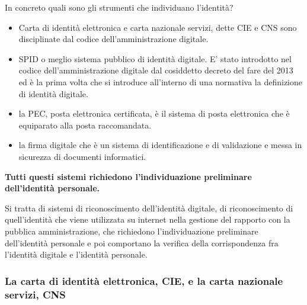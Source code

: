  In concreto quali sono gli strumenti che individuano l'identità? 
 
 \begin{itemize}
    \item Carta di identità elettronica e carta nazionale servizi, dette CIE e CNS sono disciplinate dal codice dell'amministrazione digitale.
 \item SPID o meglio sistema pubblico di identità digitale. E' stato introdotto nel codice dell'amministrazione digitale dal cosiddetto decreto del fare del 2013 ed è la prima volta che si introduce all'interno di una normativa la definizione di identità digitale. 
 \item la PEC, posta elettronica certificata, è il sistema di posta elettronica che è equiparato alla posta raccomandata. 
 \item la firma digitale che è un sistema di identificazione e di validazione e messa in sicurezza di documenti informatici. 
 \end{itemize}
 \textbf{Tutti questi sistemi richiedono l'individuazione preliminare dell'identità personale.}\par
 Si tratta di sistemi di riconoscimento dell'identità digitale, di riconoscimento di quell'identità che viene utilizzata su internet nella gestione del rapporto con la pubblica amministrazione, che richiedono l'individuazione preliminare dell'identità personale e poi comportano la verifica della corrispondenza fra l'identità digitale e l'identità personale. 

\subsubsection{La carta di identità elettronica, CIE, e la carta nazionale servizi, CNS}
 
